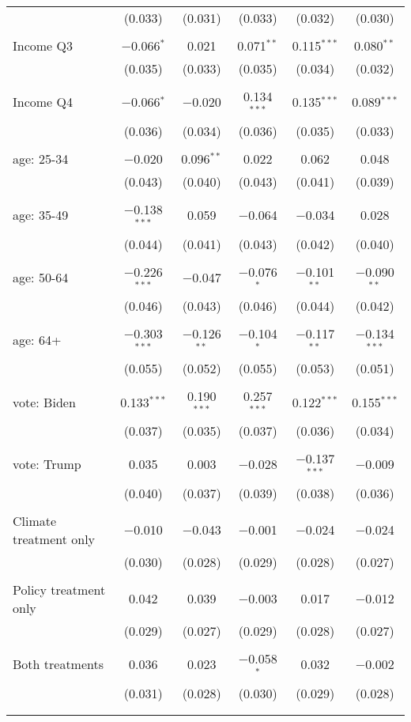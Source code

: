 \begin{tabular}{@{\extracolsep{5pt}}lccccc}
  & (0.033) & (0.031) & (0.033) & (0.032) & (0.030) \\ 
  & & & & & \\ 
 Income Q3 & $-$0.066$^{*}$ & 0.021 & 0.071$^{**}$ & 0.115$^{***}$ & 0.080$^{**}$ \\ 
  & (0.035) & (0.033) & (0.035) & (0.034) & (0.032) \\ 
  & & & & & \\ 
 Income Q4 & $-$0.066$^{*}$ & $-$0.020 & 0.134$^{***}$ & 0.135$^{***}$ & 0.089$^{***}$ \\ 
  & (0.036) & (0.034) & (0.036) & (0.035) & (0.033) \\ 
  & & & & & \\ 
 age: 25-34 & $-$0.020 & 0.096$^{**}$ & 0.022 & 0.062 & 0.048 \\ 
  & (0.043) & (0.040) & (0.043) & (0.041) & (0.039) \\ 
  & & & & & \\ 
 age: 35-49 & $-$0.138$^{***}$ & 0.059 & $-$0.064 & $-$0.034 & 0.028 \\ 
  & (0.044) & (0.041) & (0.043) & (0.042) & (0.040) \\ 
  & & & & & \\ 
 age: 50-64 & $-$0.226$^{***}$ & $-$0.047 & $-$0.076$^{*}$ & $-$0.101$^{**}$ & $-$0.090$^{**}$ \\ 
  & (0.046) & (0.043) & (0.046) & (0.044) & (0.042) \\ 
  & & & & & \\ 
 age: 64+ & $-$0.303$^{***}$ & $-$0.126$^{**}$ & $-$0.104$^{*}$ & $-$0.117$^{**}$ & $-$0.134$^{***}$ \\ 
  & (0.055) & (0.052) & (0.055) & (0.053) & (0.051) \\ 
  & & & & & \\ 
 vote: Biden & 0.133$^{***}$ & 0.190$^{***}$ & 0.257$^{***}$ & 0.122$^{***}$ & 0.155$^{***}$ \\ 
  & (0.037) & (0.035) & (0.037) & (0.036) & (0.034) \\ 
  & & & & & \\ 
 vote: Trump & 0.035 & 0.003 & $-$0.028 & $-$0.137$^{***}$ & $-$0.009 \\ 
  & (0.040) & (0.037) & (0.039) & (0.038) & (0.036) \\ 
  & & & & & \\ 
 Climate treatment only & $-$0.010 & $-$0.043 & $-$0.001 & $-$0.024 & $-$0.024 \\ 
  & (0.030) & (0.028) & (0.029) & (0.028) & (0.027) \\ 
  & & & & & \\ 
 Policy treatment only & 0.042 & 0.039 & $-$0.003 & 0.017 & $-$0.012 \\ 
  & (0.029) & (0.027) & (0.029) & (0.028) & (0.027) \\ 
  & & & & & \\ 
 Both treatments & 0.036 & 0.023 & $-$0.058$^{*}$ & 0.032 & $-$0.002 \\ 
  & (0.031) & (0.028) & (0.030) & (0.029) & (0.028) \\ 
  & & & & & \\ 
\hline \\[-1.8ex] 


\end{tabular}
